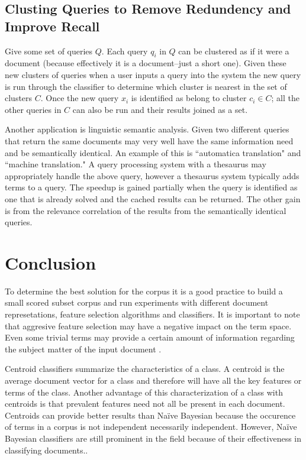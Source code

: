 \documentclass[11pt,twocolumn]{article}
\begin{document}
\subsection{Clusting Queries to Remove Redundency and Improve Recall}
Give some set of queries $Q$.  Each query $q_i$ in $Q$ can be clustered as if it were a document (because effectively it is a document--just a short one).  Given these new clusters of queries when a user inputs a query into the system the new query is run through the classifier to determine which cluster is nearest in the set of clusters $C$.  Once the new query $x_i$ is identified as belong to cluster $c_i \in C$; all the other queries in $C$ can also be run and their results joined as a set.

Another application is linguistic semantic analysis.  Given two different queries that return the same documents may very well have the same information need and be semantically identical.  An example of this is ``automatica translation" and ``machine translation."  A query processing system with a thesaurus may appropriately handle the above query, however a thesaurus system typically adds terms to a query.  The speedup is gained partially when the query is identified as one that is already solved and the cached results can be returned.  The other gain is from the relevance correlation of the results from the semantically identical queries.

\section{Conclusion}
To determine the best solution for the corpus it is a good practice to build a small scored subset corpus and run experiments with different document represetations, feature selection algorithms and classifiers.  It is important to note that aggresive feature selection may have a negative impact on the term space.  Even some trivial terms may provide a certain amount of information regarding the subject matter of the input document \cite{Joac1997}.

Centroid classifiers summarize the characteristics of a class.  A centroid is the average document vector for a class and therefore will have all the key features or terms of the class.  Another advantage of this characterization of a class with centroids is that prevalent features need not all be present in each document.  Centroids can provide better results than Na\"{i}ve Bayesian because the occurence of terms in a corpus is not independent necessarily independent.  However, Na\"{i}ve Bayesian classifiers are still prominent in the field because of their effectiveness in classifying documents.\cite{Geo2000}.
\end{document}
